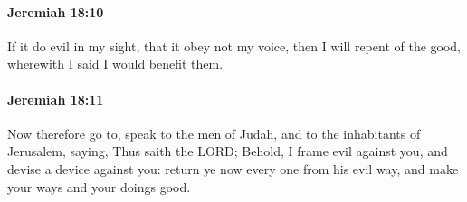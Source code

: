 		\paragraph{Jeremiah 18:10} %
			\label{JEREMIAH-18-10}

			If it do evil in my sight, that it obey not my voice, then I will repent of the good, wherewith I said I would benefit them.


		\paragraph{Jeremiah 18:11} %
			\label{JEREMIAH-18-11}

			Now therefore go to, speak to the men of Judah, and to the inhabitants of Jerusalem, saying, Thus saith the LORD; Behold, I frame evil against you, and devise a device against you: return ye now every one from his evil way, and make your ways and your doings good.

